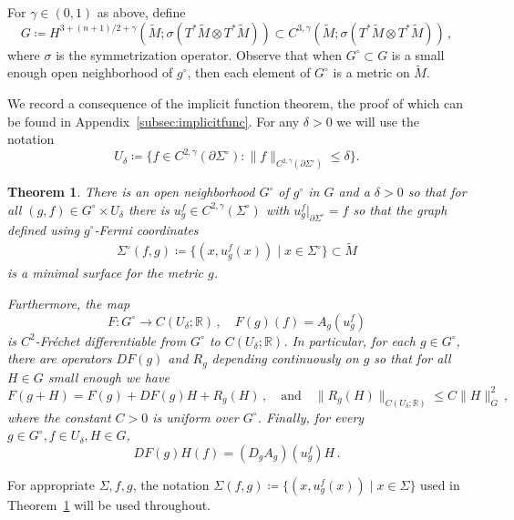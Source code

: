 \documentclass[11pt]{amsart}
\newtheorem{Theorem}{Theorem}[section]
\theoremstyle{definition}
\numberwithin{equation}{section}
\newcommand{\mR}{\mathbb{R}}                    %
\newcommand{\norm}[1]{\lVert #1 \rVert}         %
\begin{document}
For $\gamma \in (0,1)$ as above, define
\begin{equation}\label{eq: def G} G \coloneqq%
H^{3+(n+1)/2 + \gamma}\left(\widetilde{M}; \sigma\left(T^*\widetilde{M} \otimes T^*\widetilde{M}\right)\right) \subset C^{3,\gamma}\left(\widetilde{M}; \sigma\left(T^*\widetilde{M} \otimes T^*\widetilde{M}\right)\right)\,,
\end{equation}
where $\sigma$ is the symmetrization operator. Observe that when $G^\circ \subset G$ is a small enough open neighborhood of $g^\circ$, then each element of $G^\circ$ is a metric on $\widetilde{M}$.

We record a consequence of the implicit function theorem, the proof of which can be found in Appendix~\ref{subsec:implicitfunc}. For any $\delta>0$ we will use the notation 
\[
U_\delta \coloneqq \{f\in C^{2,\gamma}(\partial\Sigma^\circ)\colon \|f\|_{C^{2,\gamma}(\partial\Sigma^\circ)}\leq \delta\}.
\]

\begin{Theorem}\label{thm: smooth dependence}
There is an open neighborhood $G^\circ$ of $g^\circ$ in $G$ and a $\delta>0$ so that for all $(g,f) \in G^\circ\times U_\delta$ there is $u_{g}^f \in C^{2,\gamma}(\Sigma^\circ)$ with $u_{g}^f\vert_{\partial\Sigma^\circ}=f$ so that the graph defined using $g^\circ$-Fermi coordinates
\begin{eqnarray}\label{eq: def of Sigmafg}
\Sigma^\circ(f,g)\coloneqq \{(x,u_{g}^f(x))\mid x\in \Sigma^\circ\} \subset \widetilde{M}
\end{eqnarray}
is a minimal surface for the metric $g$. 

Furthermore, the map
\begin{equation}\label{eq: def of volume operator}
F\colon G^\circ \to C(U_{\delta}; \mR)\,, \quad F(g)(f) = A_{g}(u_{g}^f)
\end{equation}
is $C^{2}$-Fr\'echet differentiable from $G^\circ$ to $C(U_{\delta}; \mR)$. In particular, for each $g \in G^\circ$, there are operators $DF(g)$ and $R_{g}$ depending continuously on $g$ so that for all $H\in G$ small enough we have 
\begin{equation}\label{eq:tayloronF}
F(g +H) = F(g) + DF(g)H + R_{g}(H)\,,\quad\text{and}\quad \norm{R_{g}(H)}_{C(U_\delta; \mathbb R)} \leq C \norm{H}_{G}^2\,,
\end{equation}
where the constant $C>0$ is uniform over $G^\circ$. Finally, for every $g\in G^\circ, f\in U_\delta, H\in G$, 
	\begin{equation}\label{eq:dF}
		DF(g)H(f) = (D_{g}A_{g})(u_{g}^f)H\,.
	\end{equation}
\end{Theorem}
For appropriate $\Sigma,f,g$, the notation $\Sigma(f,g)\coloneqq \{(x,u_{g}^f(x))\mid x\in \Sigma\}$ used in Theorem~\ref{thm: smooth dependence} will be used throughout.%
\end{document}
